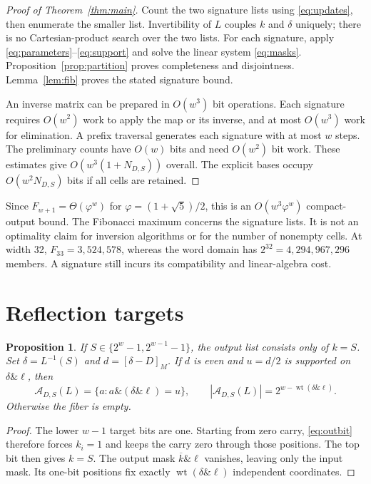 \documentclass[11pt,a4paper]{article}
\newtheorem{proposition}[theorem]{Proposition}
\theoremstyle{definition}\newtheorem{definition}[theorem]{Definition}
\newcommand{\andb}{\mathbin{\&}}
\newcommand{\res}[1]{[#1]_M}
\DeclareMathOperator{\wt}{wt}
\begin{document}
\begin{proof}[Proof of Theorem~\ref{thm:main}]
Count the two signature lists using \eqref{eq:updates}, then enumerate
the smaller list. Invertibility of $L$ couples $k$ and $\delta$ uniquely;
there is no Cartesian-product search over the two lists. For each
signature, apply \eqref{eq:parameters}--\eqref{eq:support} and solve the
linear system \eqref{eq:masks}. Proposition~\ref{prop:partition} proves
completeness and disjointness. Lemma~\ref{lem:fib} proves the stated
signature bound.

An inverse matrix can be prepared in $O(w^3)$ bit operations. Each
signature requires $O(w^2)$ work to apply the map or its inverse, and at
most $O(w^3)$ work for elimination. A prefix traversal generates each
signature with at most $w$ steps. The preliminary counts have $O(w)$
bits and need $O(w^2)$ bit work. These estimates give
$O(w^3(1+N_{D,S}))$ overall. The explicit bases occupy
$O(w^2N_{D,S})$ bits if all cells are retained.
\end{proof}

Since $F_{w+1}=\Theta(\varphi^w)$ for
$\varphi=(1+\sqrt5)/2$, this is an $O(w^3\varphi^w)$ compact-output
bound. The Fibonacci maximum concerns the signature lists. It is not
an optimality claim for inversion algorithms or for the number of
nonempty cells. At width 32, $F_{33}=3{,}524{,}578$, whereas the word
domain has $2^{32}=4{,}294{,}967{,}296$ members. A signature still incurs
its compatibility and linear-algebra cost.

\section{Reflection targets}
\begin{proposition}\label{prop:reflection}
If $S\in\{2^w-1,2^{w-1}-1\}$, the output list consists only of $k=S$.
Set $\delta=L^{-1}(S)$ and $d=\res{\delta-D}$. If $d$ is even and
$u=d/2$ is supported on $\delta\andb\ell$, then
\begin{equation}\label{eq:reflection}
\mathcal A_{D,S}(L)=\{a:a\andb(\delta\andb\ell)=u\},
\qquad |\mathcal A_{D,S}(L)|=2^{w-\wt(\delta\andb\ell)}.
\end{equation}
Otherwise the fiber is empty.
\end{proposition}
\begin{proof}
The lower $w-1$ target bits are one. Starting from zero carry,
\eqref{eq:outbit} therefore forces $k_i=1$ and keeps the carry zero
through those positions. The top bit then gives $k=S$. The output
mask $\overline{k}\andb\ell$ vanishes, leaving only the input mask.
Its one-bit positions fix exactly $\wt(\delta\andb\ell)$ independent
coordinates.
\end{proof}
\end{document}
